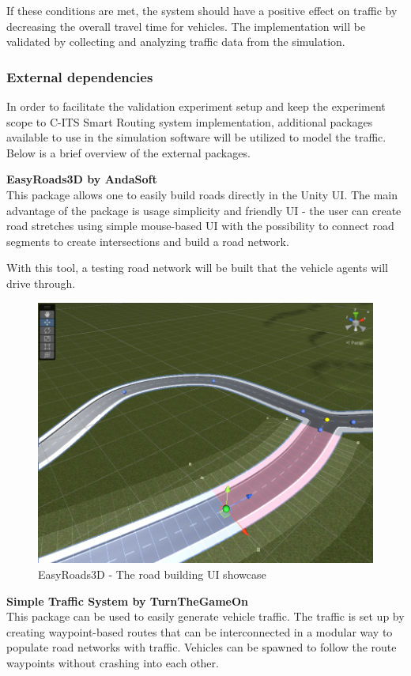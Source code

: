 \documentclass[main.tex]{subfiles}
\begin{document}
If these conditions are met, the system should have a positive effect on traffic by decreasing the overall 
travel time for vehicles. The implementation will be validated by collecting and analyzing traffic data from 
the simulation.

\subsubsection{External dependencies}

In order to facilitate the validation experiment setup and keep the experiment scope to C-ITS
Smart Routing system implementation, additional packages available to use in the simulation
software will be utilized to model the traffic. Below is a brief overview of the external packages.

\textbf{EasyRoads3D by AndaSoft} \smallskip \\
This package allows one to easily build roads directly in the Unity UI. The main advantage of the 
package is usage simplicity and friendly UI - the user can create road stretches using simple
mouse-based UI with the possibility to connect road segments to create intersections
and build a road network.

With this tool, a testing road network will be built that the vehicle agents will drive through.

\begin{figure}[htbp]
    \centering
    \includegraphics[width=.8\textwidth]{easy-roads.png}
    \caption{EasyRoads3D - The road building UI showcase}
    \label{fig-easyroads}
\end{figure}

\textbf{Simple Traffic System by TurnTheGameOn} \smallskip \\
This package can be used to easily generate vehicle traffic. The traffic is set up by creating
waypoint-based routes that can be interconnected in a modular way to populate road networks
with traffic. Vehicles can be spawned to follow the route waypoints without crashing into each
other.
\end{document}
